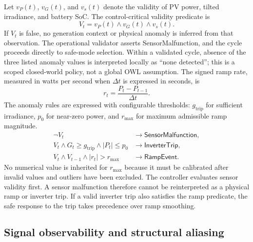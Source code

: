 \documentclass[
	letterpaper,
	10pt,
	unnumberedsections,
	twoside,
]{LTJournalArticle}
\newcommand{\valueof}[1]{\textsf{#1}}
\begin{document}
Let $v_P(t)$, $v_G(t)$, and $v_s(t)$ denote the validity of PV power, tilted irradiance, and battery SoC. The control-critical validity predicate is
\begin{equation}
V_t=v_P(t)\wedge v_G(t)\wedge v_s(t).
\label{eq:validity}
\end{equation}
If $V_t$ is false, no generation context or physical anomaly is inferred from that observation. The operational validator asserts \valueof{SensorMalfunction}, and the cycle proceeds directly to safe-mode selection. Within a validated cycle, absence of the three listed anomaly values is interpreted locally as ``none detected''; this is a scoped closed-world policy, not a global OWL assumption.
The signed ramp rate, measured in watts per second when $\Delta t$ is expressed in seconds, is
\begin{equation}
r_t=\frac{P_t-P_{t-1}}{\Delta t}.
\label{eq:signed-ramp}
\end{equation}
The anomaly rules are expressed with configurable thresholds: $g_{\mathrm{trip}}$ for sufficient irradiance, $p_0$ for near-zero power, and $r_{\max}$ for maximum admissible ramp magnitude.
\begin{align}
\neg V_t
&\longrightarrow \valueof{SensorMalfunction},
\label{eq:sensor-malfunction}\\
V_t\wedge G_t\geq g_{\mathrm{trip}}
\wedge |P_t|\leq p_0
&\longrightarrow \valueof{InverterTrip},
\label{eq:inverter-trip}\\
V_t\wedge V_{t-1}\wedge |r_t|>r_{\max}
&\longrightarrow \valueof{RampEvent}.
\label{eq:ramp-event}
\end{align}
No numerical value is inherited for $r_{\max}$ because it must be calibrated after invalid values and outliers have been excluded. The controller evaluates sensor validity first. A sensor malfunction therefore cannot be reinterpreted as a physical ramp or inverter trip. If a valid inverter trip also satisfies the ramp predicate, the safe response to the trip takes precedence over ramp smoothing.

\subsection{Signal observability and structural aliasing}
\end{document}
